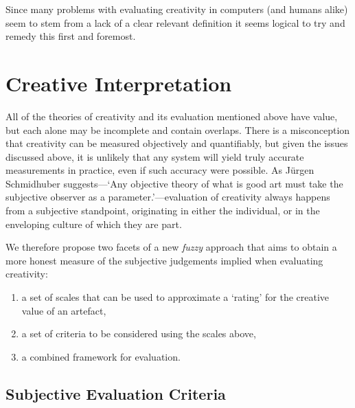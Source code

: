 Since many problems with evaluating creativity in computers (and humans alike) seem to stem from a lack of a clear relevant definition it seems logical to try and remedy this first and foremost.


\section{Creative Interpretation}

All of the theories of creativity and its evaluation mentioned above have value, but each alone may be incomplete and contain overlaps. There is a misconception that creativity can be measured objectively and quantifiably, but given the issues discussed above, it is unlikely that any system will yield truly accurate measurements in practice, even if such accuracy were possible. As J{\"u}rgen Schmidhuber suggests---`Any objective theory of what is good art must take the subjective observer as a parameter.'\autocite{Schmidhuber2006}---evaluation of creativity always happens from a subjective standpoint, originating in either the individual, or in the enveloping culture of which they are part.

\colorbox{red!30}{We} therefore propose two facets of a new \emph{fuzzy} approach that aims to obtain a more honest measure of the subjective judgements implied when evaluating creativity:

\begin{enumerate}
  \item a set of scales that can be used to approximate a `rating' for the creative value of an artefact,
  \item a set of criteria to be considered using the scales above,
  \item a combined framework for evaluation.
\end{enumerate}


\subsection{Subjective Evaluation Criteria}
\label{s:sec}

